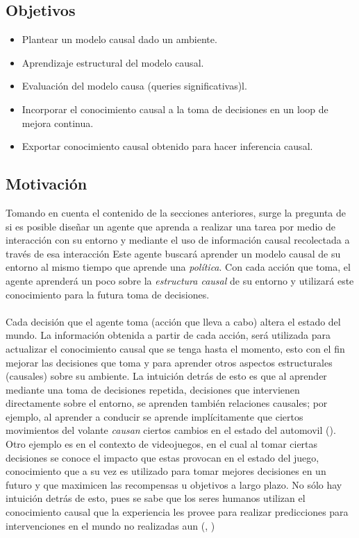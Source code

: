 \documentclass[11pt]{article}
\theoremstyle{plain}
\begin{document}
\subsection{Objetivos}
\begin{itemize}
\item Plantear un modelo causal dado un ambiente.
\item Aprendizaje estructural del modelo causal.
\item Evaluación del modelo causa (queries significativas)l.
\item Incorporar el conocimiento causal a la toma de decisiones en un loop de mejora continua.
\item Exportar conocimiento causal obtenido para hacer inferencia causal.
\end{itemize}
\subsection{Motivación}
Tomando en cuenta el contenido de la secciones anteriores, surge la pregunta de si es posible diseñar un agente que aprenda a realizar una tarea por medio de interacción con su entorno y mediante el uso de información causal recolectada a través de esa interacción
Este agente buscará aprender un modelo causal de su entorno al mismo tiempo que aprende una \textit{política}. Con cada acción que toma, el agente aprenderá  un poco sobre la \textit{estructura causal} de su entorno y utilizará este conocimiento para la futura toma de decisiones.\\
\\
Cada decisión que el agente toma (acción que lleva a cabo) altera el estado del mundo. La información obtenida a partir de cada acción, será utilizada para actualizar el conocimiento causal que se tenga hasta el momento, esto con el fin mejorar las decisiones que toma y para aprender otros aspectos estructurales (causales) sobre su ambiente. La intuición detrás de esto es que al aprender mediante una toma de decisiones repetida, decisiones que intervienen directamente sobre el entorno, se aprenden también relaciones causales; por ejemplo, al aprender a conducir se aprende implícitamente que ciertos movimientos del volante \textit{causan} ciertos cambios en el estado del automovil (\cite{danks2014unifying}). Otro ejemplo es en el contexto de videojuegos, en el cual al tomar ciertas decisiones se conoce el impacto que estas provocan en el estado del juego, conocimiento que a su vez es utilizado para tomar mejores decisiones en un futuro y que maximicen las recompensas u objetivos a largo plazo. No sólo hay intuición detrás de esto, pues se sabe que los seres humanos utilizan el conocimiento causal que la experiencia les provee para realizar predicciones para intervenciones en el mundo no realizadas aun (\cite{meder2008inferring}, \cite{hagmayer2009decision})\\
\end{document}
